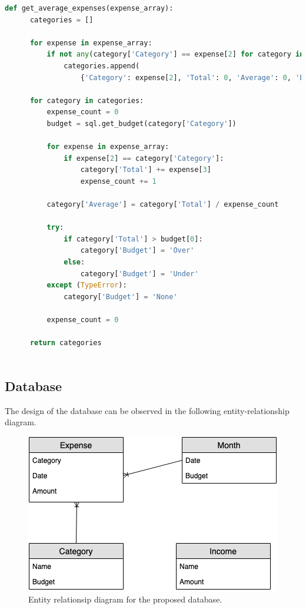 \documentclass[11pt]{article}
\begin{document}
  \begin{landscape}
    \begin{lstlisting}[language=Python, caption=Source code for \textit{get\_average\_expenses().}, captionpos=b]
      def get_average_expenses(expense_array):
      categories = []

      for expense in expense_array:
          if not any(category['Category'] == expense[2] for category in categories):
              categories.append(
                  {'Category': expense[2], 'Total': 0, 'Average': 0, 'Budget': None})

      for category in categories:
          expense_count = 0
          budget = sql.get_budget(category['Category'])

          for expense in expense_array:
              if expense[2] == category['Category']:
                  category['Total'] += expense[3]
                  expense_count += 1

          category['Average'] = category['Total'] / expense_count

          try:
              if category['Total'] > budget[0]:
                  category['Budget'] = 'Over'
              else:
                  category['Budget'] = 'Under'
          except (TypeError):
              category['Budget'] = 'None'

          expense_count = 0

      return categories
      
    \end{lstlisting}
  \end{landscape}

  \subsection{Database}
  The design of the database can be observed in the following entity-relationship diagram.

  \begin{figure}[H]
    \centering
    \includegraphics[scale=0.7]{database.png}
    \caption{Entity relationsip diagram for the proposed database.}
  \end{figure}
\end{document}
